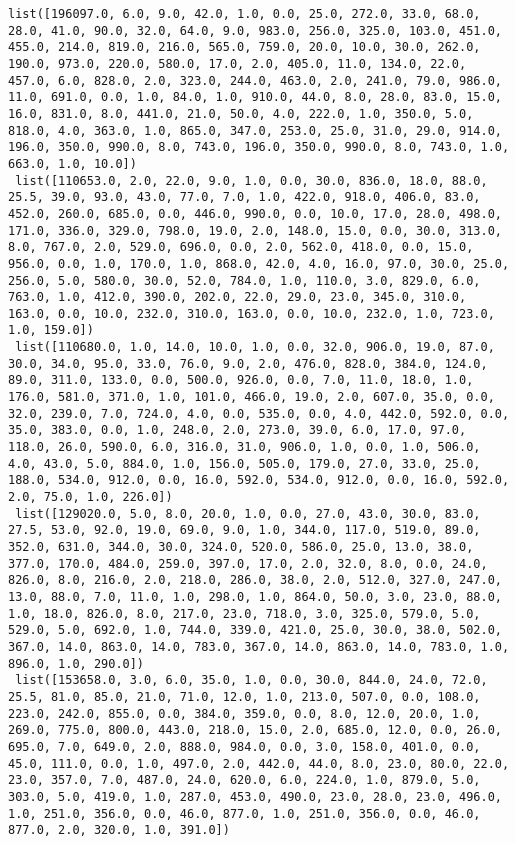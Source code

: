 \documentclass[11pt]{article}
\begin{document}
\begin{Verbatim}[commandchars=\\\{\}]
 list([196097.0, 6.0, 9.0, 42.0, 1.0, 0.0, 25.0, 272.0, 33.0, 68.0, 28.0, 41.0, 90.0, 32.0, 64.0, 9.0, 983.0, 256.0, 325.0, 103.0, 451.0, 455.0, 214.0, 819.0, 216.0, 565.0, 759.0, 20.0, 10.0, 30.0, 262.0, 190.0, 973.0, 220.0, 580.0, 17.0, 2.0, 405.0, 11.0, 134.0, 22.0, 457.0, 6.0, 828.0, 2.0, 323.0, 244.0, 463.0, 2.0, 241.0, 79.0, 986.0, 11.0, 691.0, 0.0, 1.0, 84.0, 1.0, 910.0, 44.0, 8.0, 28.0, 83.0, 15.0, 16.0, 831.0, 8.0, 441.0, 21.0, 50.0, 4.0, 222.0, 1.0, 350.0, 5.0, 818.0, 4.0, 363.0, 1.0, 865.0, 347.0, 253.0, 25.0, 31.0, 29.0, 914.0, 196.0, 350.0, 990.0, 8.0, 743.0, 196.0, 350.0, 990.0, 8.0, 743.0, 1.0, 663.0, 1.0, 10.0])
 list([110653.0, 2.0, 22.0, 9.0, 1.0, 0.0, 30.0, 836.0, 18.0, 88.0, 25.5, 39.0, 93.0, 43.0, 77.0, 7.0, 1.0, 422.0, 918.0, 406.0, 83.0, 452.0, 260.0, 685.0, 0.0, 446.0, 990.0, 0.0, 10.0, 17.0, 28.0, 498.0, 171.0, 336.0, 329.0, 798.0, 19.0, 2.0, 148.0, 15.0, 0.0, 30.0, 313.0, 8.0, 767.0, 2.0, 529.0, 696.0, 0.0, 2.0, 562.0, 418.0, 0.0, 15.0, 956.0, 0.0, 1.0, 170.0, 1.0, 868.0, 42.0, 4.0, 16.0, 97.0, 30.0, 25.0, 256.0, 5.0, 580.0, 30.0, 52.0, 784.0, 1.0, 110.0, 3.0, 829.0, 6.0, 763.0, 1.0, 412.0, 390.0, 202.0, 22.0, 29.0, 23.0, 345.0, 310.0, 163.0, 0.0, 10.0, 232.0, 310.0, 163.0, 0.0, 10.0, 232.0, 1.0, 723.0, 1.0, 159.0])
 list([110680.0, 1.0, 14.0, 10.0, 1.0, 0.0, 32.0, 906.0, 19.0, 87.0, 30.0, 34.0, 95.0, 33.0, 76.0, 9.0, 2.0, 476.0, 828.0, 384.0, 124.0, 89.0, 311.0, 133.0, 0.0, 500.0, 926.0, 0.0, 7.0, 11.0, 18.0, 1.0, 176.0, 581.0, 371.0, 1.0, 101.0, 466.0, 19.0, 2.0, 607.0, 35.0, 0.0, 32.0, 239.0, 7.0, 724.0, 4.0, 0.0, 535.0, 0.0, 4.0, 442.0, 592.0, 0.0, 35.0, 383.0, 0.0, 1.0, 248.0, 2.0, 273.0, 39.0, 6.0, 17.0, 97.0, 118.0, 26.0, 590.0, 6.0, 316.0, 31.0, 906.0, 1.0, 0.0, 1.0, 506.0, 4.0, 43.0, 5.0, 884.0, 1.0, 156.0, 505.0, 179.0, 27.0, 33.0, 25.0, 188.0, 534.0, 912.0, 0.0, 16.0, 592.0, 534.0, 912.0, 0.0, 16.0, 592.0, 2.0, 75.0, 1.0, 226.0])
 list([129020.0, 5.0, 8.0, 20.0, 1.0, 0.0, 27.0, 43.0, 30.0, 83.0, 27.5, 53.0, 92.0, 19.0, 69.0, 9.0, 1.0, 344.0, 117.0, 519.0, 89.0, 352.0, 631.0, 344.0, 30.0, 324.0, 520.0, 586.0, 25.0, 13.0, 38.0, 377.0, 170.0, 484.0, 259.0, 397.0, 17.0, 2.0, 32.0, 8.0, 0.0, 24.0, 826.0, 8.0, 216.0, 2.0, 218.0, 286.0, 38.0, 2.0, 512.0, 327.0, 247.0, 13.0, 88.0, 7.0, 11.0, 1.0, 298.0, 1.0, 864.0, 50.0, 3.0, 23.0, 88.0, 1.0, 18.0, 826.0, 8.0, 217.0, 23.0, 718.0, 3.0, 325.0, 579.0, 5.0, 529.0, 5.0, 692.0, 1.0, 744.0, 339.0, 421.0, 25.0, 30.0, 38.0, 502.0, 367.0, 14.0, 863.0, 14.0, 783.0, 367.0, 14.0, 863.0, 14.0, 783.0, 1.0, 896.0, 1.0, 290.0])
 list([153658.0, 3.0, 6.0, 35.0, 1.0, 0.0, 30.0, 844.0, 24.0, 72.0, 25.5, 81.0, 85.0, 21.0, 71.0, 12.0, 1.0, 213.0, 507.0, 0.0, 108.0, 223.0, 242.0, 855.0, 0.0, 384.0, 359.0, 0.0, 8.0, 12.0, 20.0, 1.0, 269.0, 775.0, 800.0, 443.0, 218.0, 15.0, 2.0, 685.0, 12.0, 0.0, 26.0, 695.0, 7.0, 649.0, 2.0, 888.0, 984.0, 0.0, 3.0, 158.0, 401.0, 0.0, 45.0, 111.0, 0.0, 1.0, 497.0, 2.0, 442.0, 44.0, 8.0, 23.0, 80.0, 22.0, 23.0, 357.0, 7.0, 487.0, 24.0, 620.0, 6.0, 224.0, 1.0, 879.0, 5.0, 303.0, 5.0, 419.0, 1.0, 287.0, 453.0, 490.0, 23.0, 28.0, 23.0, 496.0, 1.0, 251.0, 356.0, 0.0, 46.0, 877.0, 1.0, 251.0, 356.0, 0.0, 46.0, 877.0, 2.0, 320.0, 1.0, 391.0])

\end{Verbatim}
\end{document}
